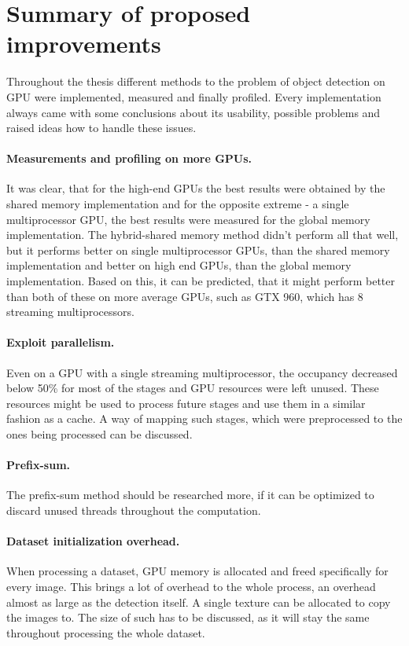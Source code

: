 \section{Summary of proposed improvements}

Throughout the thesis different methods to the problem of object detection on GPU were implemented, measured and finally profiled. Every implementation always came with some conclusions about its usability, possible problems and raised ideas how to handle these issues.

\paragraph{Measurements and profiling on more GPUs.} It was clear, that for the high-end GPUs the best results were obtained by the shared memory implementation and for the opposite extreme - a single multiprocessor GPU, the best results were measured for the global memory implementation. The hybrid-shared memory method didn't perform all that well, but it performs better on single multiprocessor GPUs, than the shared memory implementation and better on high end GPUs, than the global memory implementation. Based on this, it can be predicted, that it might perform better than both of these on more average GPUs, such as GTX 960, which has 8 streaming multiprocessors.

\paragraph{Exploit parallelism.} Even on a GPU with a single streaming multiprocessor, the occupancy decreased below 50\% for most of the stages and GPU resources were left unused. These resources might be used to process future stages and use them in a similar fashion as a cache. A way of mapping such stages, which were preprocessed to the ones being processed can be discussed.

\paragraph{Prefix-sum.} The prefix-sum method should be researched more, if it can be optimized to discard unused threads throughout the computation.

\paragraph{Dataset initialization overhead.} When processing a dataset, GPU memory is allocated and freed specifically for every image. This brings a lot of overhead to the whole process, an overhead almost as large as the detection itself. A single texture can be allocated to copy the images to. The size of such has to be discussed, as it will stay the same throughout processing the whole dataset.

